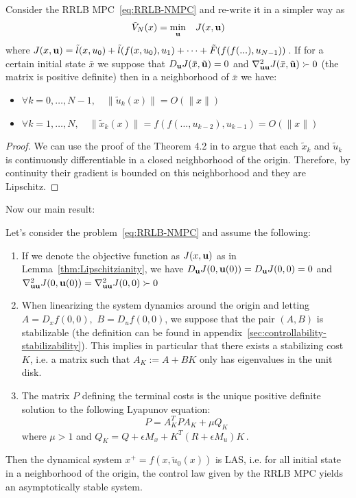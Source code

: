 \documentclass[12pt]{article}
\begin{document}
\begin{lemma}
	\label{thm:Lipschitzianity}
	Consider the RRLB MPC~\ref{eq:RRLB-NMPC} and re-write it in a simpler way as
	$$\tilde{V}_N(x)=\underset{\bf{u}}{\min} \quad J(x,\bf{u})$$
	where $J(x,\bf{u})=\tilde{l}(x,u_0)+\tilde{l}(f(x,u_0),u_1)+\cdots+\tilde{F}(f(f(...),u_{N-1}))$\,.
	If for a certain initial state $\bar{x}$ we suppose that $D_\bf{u}J(\bar{x},\tilde{\bf{u}})=0$ and $\nabla_{\bf{u}\bf{u}}^2J(\bar{x}, \tilde{\bf{u}})\succ 0$ (the matrix is positive definite) then in a neighborhood of $\bar{x}$ we have:
	\begin{itemize}[label=\textbullet]
		\item $\forall k=0,\ldots,N-1,\quad \|\tilde{u}_k(x)\|=O(\|x\|)$
		\item $\forall k=1,\ldots,N,\quad \|\tilde{x}_k(x)\|=f(f(\ldots,u_{k-2}),u_{k-1})=O(\|x\|)$
	\end{itemize}
\end{lemma}
\begin{proof}
	We can use the proof of the Theorem 4.2 in \cite{lectures-parametric-optimization} to argue that each $\tilde{x}_k$ and $\tilde{u}_k$ is continuously differentiable in a closed neighborhood of the origin.
	Therefore, by continuity their gradient is bounded on this neighborhood and they are Lipschitz.
\end{proof}

\noindent Now our main result:

\begin{theorem}\label{thm:nominal-stability}
	Let's consider the problem~\ref{eq:RRLB-NMPC} and assume the following:
	\begin{enumerate}
		\item If we denote the objective function as $J(x,\bf{u})$ as in Lemma~\ref{thm:Lipschitzianity}, we have $D_\bf{u}J(0,\bf{u}(0))=D_\bf{u}J(0,0)=0$ and $\nabla^2_{\bf{u}\bf{u}}J(0,\bf{u}(0))=\nabla^2_{\bf{u}\bf{u}}J(0,0)\succ 0$

		\item When linearizing the system dynamics around the origin and letting $A=D_xf(0,0),$ $B=D_uf(0,0)$, we suppose that the pair $(A,B)$ is stabilizable (the definition can be found in appendix~\ref{sec:controllability-stabilizability}).
		This implies in particular that there exists a stabilizing cost $K$, i.e. a matrix such that $A_K:=A+BK$ only has eigenvalues in the unit disk.

		\item The matrix $P$ defining the terminal costs is the unique positive definite solution to the following Lyapunov equation:
		\begin{equation*}
			P=A_K^TPA_K+\mu Q_K
		\end{equation*}
		where $\mu>1$ and $Q_K=Q+\epsilon M_x+K^T(R+\epsilon M_u)K$\,.
	\end{enumerate}
	Then the dynamical system $x^+=f(x,\tilde{u}_0(x))$ is LAS, i.e. for all initial state in a neighborhood of the origin, the control law given by the RRLB MPC yields an asymptotically stable system.
\end{theorem}
\end{document}

